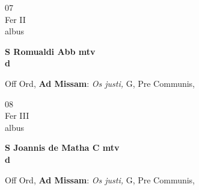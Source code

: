 \documentclass[10pt, openany]{book}
\begin{document}
        \begin{center}
            \begin{minipage}{3.5in}
                \vspace{2em}
                \begin{minipage}{0.5in}
                    {\Huge 07} \\
                    {\normalsize Fer II} \\
                    {\normalsize albus}
                \end{minipage}
                \begin{minipage}{3.0in}
                    \textbf{ \large S Romualdi Abb mtv \\
                    \textnormal{\normalsize d}} \\ 
                \end{minipage}
                \begin{justify}Off Ord, \textbf{Ad Missam}: \textit{Os justi,} G, Pre Communis,   
                \end{justify}
            \end{minipage}
        \end{center}
    
        \begin{center}
            \begin{minipage}{3.5in}
                \vspace{2em}
                \begin{minipage}{0.5in}
                    {\Huge 08} \\
                    {\normalsize Fer III} \\
                    {\normalsize albus}
                \end{minipage}
                \begin{minipage}{3.0in}
                    \textbf{ \large S Joannis de Matha C mtv \\
                    \textnormal{\normalsize d}} \\ 
                \end{minipage}
                \begin{justify}Off Ord, \textbf{Ad Missam}: \textit{Os justi,} G, Pre Communis,   
                \end{justify}
            \end{minipage}
        \end{center}
    
\end{document}
